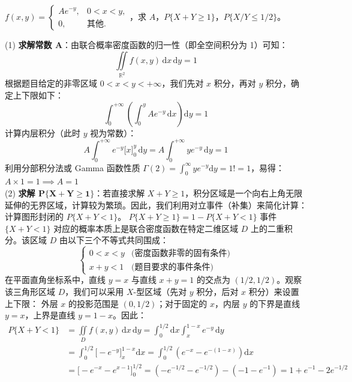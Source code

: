 \documentclass[lang=cn,11pt]{elegantbook}
\begin{document}
\begin{exercise}[概率计算] \label{exer:3-c12}
$f(x,y) = \begin{cases} Ae^{-y}, & 0 < x < y, \\ 0, & \text{其他}. \end{cases}$，求 $A$，$P\{X+Y \geqslant 1\}$，$P\{X/Y \leqslant 1/2\}$。
\end{exercise}
\begin{solution}
(1) \textbf{求解常数 $\mathbf{A}$}：由联合概率密度函数的归一性（即全空间积分为 1）可知：
\[
\iint\limits_{\mathbb{R}^2} f(x,y) \,\mathrm{d}x\,\mathrm{d}y = 1
\]
根据题目给定的非零区域 $0 < x < y < +\infty$，我们先对 $x$ 积分，再对 $y$ 积分，确定上下限如下：
\[
\int_{0}^{+\infty} \left( \int_{0}^{y} A e^{-y} \,\mathrm{d}x \right) \mathrm{d}y = 1
\]
计算内层积分（此时 $y$ 视为常数）：
\[
A \int_{0}^{+\infty} e^{-y} \Big[ x \Big]_{0}^{y} \,\mathrm{d}y = A \int_{0}^{+\infty} y e^{-y} \,\mathrm{d}y = 1
\]
利用分部积分法或 Gamma 函数性质 $\Gamma(2) = \int_0^\infty y e^{-y} \mathrm{d}y = 1! = 1$，易得：
\(
A \times 1 = 1 \implies A = 1
\)\\
(2) \textbf{求解 $\mathbf{P\{X+Y \geqslant 1\}}$}：若直接求解 $X+Y \geqslant 1$，积分区域是一个向右上角无限延伸的无界区域，计算较为繁琐。因此，我们利用对立事件（补集）来简化计算：计算图形封闭的 $P\{X+Y < 1\}$。
\(
P\{X+Y \geqslant 1\} = 1 - P\{X+Y < 1\}
\)
事件 $\{X+Y < 1\}$ 对应的概率本质上是联合密度函数在特定二维区域 $D$ 上的二重积分。该区域 $D$ 由以下三个不等式共同围成：
\[
\begin{cases}
0 < x < y & \text{(密度函数非零的固有条件)} \\
x + y < 1 & \text{(题目要求的事件条件)}
\end{cases}
\]
在平面直角坐标系中，直线 $y = x$ 与直线 $x + y = 1$ 的交点为 $(1/2, 1/2)$。观察该三角形区域 $D$，我们可以采用 $X$-型区域（先对 $y$ 积分，后对 $x$ 积分）来设置上下限：
外层 $x$ 的投影范围是 $(0, 1/2)$；对于固定的 $x$，内层 $y$ 的下界是直线 $y=x$，上界是直线 $y=1-x$。因此：
\begin{align*}
P\{X+Y < 1\} &= \iint\limits_{D} f(x,y) \,\mathrm{d}x\,\mathrm{d}y = \int_{0}^{1/2} \mathrm{d}x \int_{x}^{1-x} e^{-y} \,\mathrm{d}y \\
&= \int_{0}^{1/2} \Big[ -e^{-y} \Big]_{x}^{1-x} \mathrm{d}x = \int_{0}^{1/2} \left( e^{-x} - e^{-(1-x)} \right) \mathrm{d}x \\
&= \Big[ -e^{-x} - e^{x-1} \Big]_{0}^{1/2} = \left( -e^{-1/2} - e^{-1/2} \right) - \left( -1 - e^{-1} \right)= 1 + e^{-1} - 2e^{-1/2}
\end{align*}

\end{solution}
\end{document}
